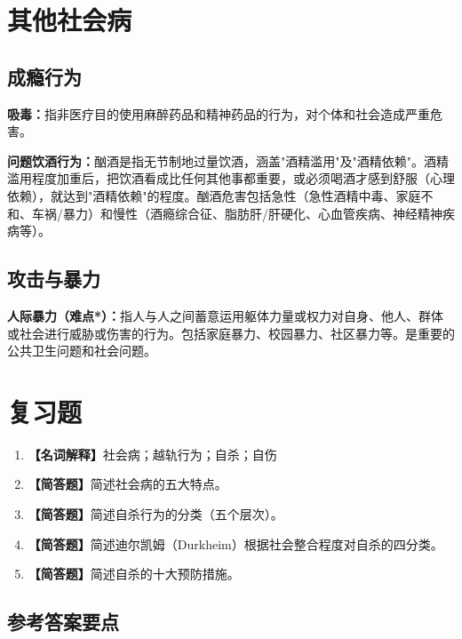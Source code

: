 \section{其他社会病}

\subsection{成瘾行为}

\begin{defbox}
\textbf{吸毒：}指非医疗目的使用麻醉药品和精神药品的行为，对个体和社会造成严重危害。

\textbf{问题饮酒行为：}酗酒是指无节制地过量饮酒，涵盖"酒精滥用"及"酒精依赖"。酒精滥用程度加重后，把饮酒看成比任何其他事都重要，或必须喝酒才感到舒服（心理依赖），就达到"酒精依赖"的程度。酗酒危害包括急性（急性酒精中毒、家庭不和、车祸/暴力）和慢性（酒瘾综合征、脂肪肝/肝硬化、心血管疾病、神经精神疾病等）。
\end{defbox}

\subsection{攻击与暴力}

\begin{defbox}
\textbf{人际暴力（难点*）：}指人与人之间蓄意运用躯体力量或权力对自身、他人、群体或社会进行威胁或伤害的行为。包括家庭暴力、校园暴力、社区暴力等。是重要的公共卫生问题和社会问题。
\end{defbox}

\section{复习题}

\begin{enumerate}[leftmargin=*, itemsep=8pt]
    \item \textbf{【名词解释】}社会病；越轨行为；自杀；自伤
    \item \textbf{【简答题】}简述社会病的五大特点。
    \item \textbf{【简答题】}简述自杀行为的分类（五个层次）。
    \item \textbf{【简答题】}简述迪尔凯姆（Durkheim）根据社会整合程度对自杀的四分类。
    \item \textbf{【简答题】}简述自杀的十大预防措施。
\end{enumerate}

\subsection*{参考答案要点}

